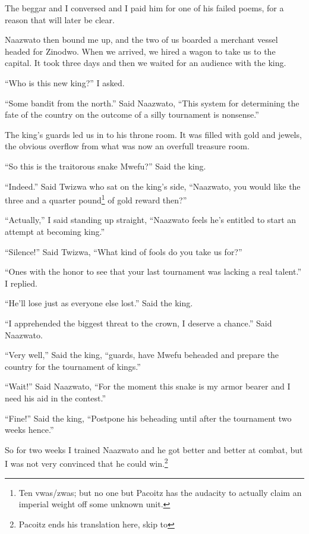 The beggar and I conversed and I paid him for one of his failed poems, for a reason that will later be clear.

Naazwato then bound me up, and the two of us boarded a merchant vessel headed for Zinodwo.
When we arrived, we hired a wagon to take us to the capital. It took three days and then we waited for an audience with the king.

``Who is this new king?'' I asked.

``Some bandit from the north.'' Said Naazwato, ``This system for determining the fate of the country on the outcome of a silly tournament is nonsense.''

The king's guards led us in to his throne room. It was filled with gold and jewels, the obvious overflow from what was now an overfull treasure room.

``So this is the traitorous snake Mwefu?'' Said the king.

``Indeed.'' Said Twizwa who sat on the king's side, ``Naazwato, you would like the three and a quarter pound\footnote{Ten vwas/zwas; but no one but Pacoitz has the audacity to actually claim an imperial weight off some unknown unit.} of gold reward then?''

``Actually,'' I said standing up straight, ``Naazwato feels he's entitled to start an attempt at becoming king.''

``Silence!'' Said Twizwa, ``What kind of fools do you take us for?''

``Ones with the honor to see that your last tournament was lacking a real talent.'' I replied.

``He'll lose just as everyone else lost.'' Said the king.

``I apprehended the biggest threat to the crown, I deserve a chance.'' Said Naazwato.

``Very well,'' Said the king, ``guards, have Mwefu beheaded and prepare the country for the tournament of kings.''

``Wait!'' Said Naazwato, ``For the moment this snake is my armor bearer and I need his aid in the contest.''

``Fine!'' Said the king, ``Postpone his beheading until after the tournament two weeks hence.''

So for two weeks I trained Naazwato and he got better and better at combat, but I was not very convinced that he could win.\footnote{Pacoitz ends his translation here, skip to}
